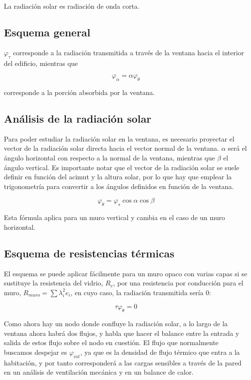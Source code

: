 \documentclass[12pt]{article}
\begin{document}
La radiación solar es radiación de onda corta.

\subsection{Esquema general}

$ \varphi _\tau $ corresponde a la radiación transmitida a través de la ventana hacia el interior del edificio, mientras que

\[ \varphi _\alpha = \alpha \varphi _\theta \]

corresponde a la porción absorbida por la ventana.

\subsection{Análisis de la radiación solar}

Para poder estudiar la radiación solar en la ventana, es necesario proyectar el vector de la radiación solar directa hacia el vector normal de la ventana. $ \alpha $ será el ángulo horizontal con respecto a la normal de la ventana, mientras que $ \beta $ el ángulo vertical. Es importante notar que el vector de la radiación solar se suele definir en función del acimut y la altura solar, por lo que hay que emplear la trigonometría para convertir a los ángulos definidos en función de la ventana.

\[ \varphi _\theta = \varphi _s \cos \alpha \cos \beta \]

Esta fórmula aplica para un muro vertical y cambia en el caso de un muro horizontal.

\subsection{Esquema de resistencias térmicas}

El esquema se puede aplicar fácilmente para un muro opaco con varias capas si se sustituye la resistencia del vidrio, $ R_v $, por una resistencia por conducción para el muro, $ R_{ muro } = \sum{ \lambda ^2 _{i} e_i } $, en cuyo caso, la radiación transmitida sería 0:

\[ \tau \varphi _\theta = 0 \]

Como ahora hay un nodo donde confluye la radiación solar, a lo largo de la ventana ahora habrá dos flujos, y habla que hacer el balance entre la entrada y salida de estos flujo sobre el nodo en cuestión. El flujo que normalmente buscamos despejar es $ \varphi _{ int } $, ya que es la densidad de flujo térmico que entra a la habitación, y por tanto corresponderá a las cargas sensibles a través de la pared en un análisis de ventilación mecánica y en un balance de calor.
\end{document}
